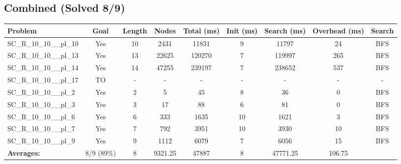 \documentclass{article}
\begin{document}
\subsection*{Combined (Solved 8/9)}
\begin{tabular}{lcccccccc}
\toprule
Problem & Goal & Length & Nodes & Total (ms) & Init (ms) & Search (ms) & Overhead (ms) & Search \\
\midrule
SC\_R\_10\_10\_\_pl\_10 & Yes & 10 & 2431 & 11831 & 9 & 11797 & 24 & BFS \\
SC\_R\_10\_10\_\_pl\_13 & Yes & 13 & 22625 & 120270 & 7 & 119997 & 265 & BFS \\
SC\_R\_10\_10\_\_pl\_14 & Yes & 14 & 47255 & 239197 & 7 & 238652 & 537 & BFS \\
SC\_R\_10\_10\_\_pl\_17 & TO & - & - & - & - & - & - & - \\
SC\_R\_10\_10\_\_pl\_2 & Yes & 2 & 5 & 45 & 8 & 36 & 0 & BFS \\
SC\_R\_10\_10\_\_pl\_3 & Yes & 3 & 17 & 88 & 6 & 81 & 0 & BFS \\
SC\_R\_10\_10\_\_pl\_6 & Yes & 6 & 333 & 1635 & 10 & 1621 & 3 & BFS \\
SC\_R\_10\_10\_\_pl\_7 & Yes & 7 & 792 & 3951 & 10 & 3930 & 10 & BFS \\
SC\_R\_10\_10\_\_pl\_9 & Yes & 9 & 1112 & 6079 & 7 & 6056 & 15 & BFS \\
\textbf{Averages:} & 8/9 (89\%) & 8 & 9321.25 & 47887 & 8 & 47771.25 & 106.75 & \\
\bottomrule
\end{tabular}
\\[0.7cm]
\end{document}
